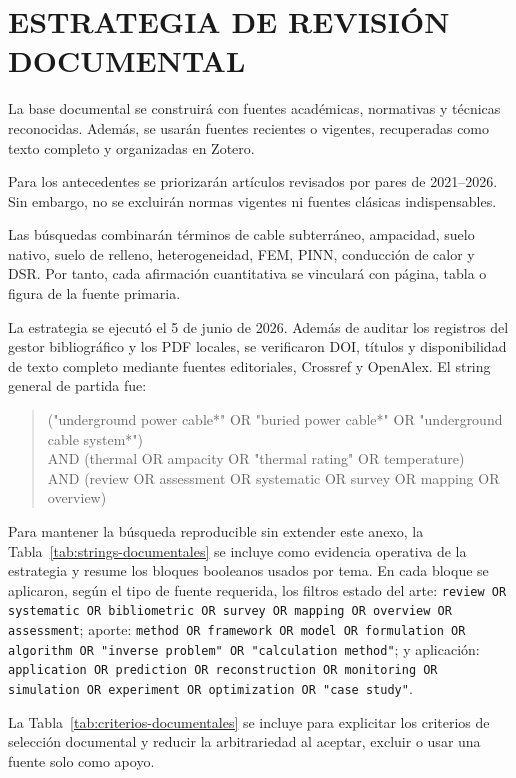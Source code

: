 \section{ESTRATEGIA DE REVISIÓN DOCUMENTAL}
\thispagestyle{empty}

La base documental se construirá con fuentes académicas, normativas y técnicas reconocidas. Además, se usarán fuentes recientes o vigentes, recuperadas como texto completo y organizadas en Zotero.

Para los antecedentes se priorizarán artículos revisados por pares de 2021--2026. Sin embargo, no se excluirán normas vigentes ni fuentes clásicas indispensables.

Las búsquedas combinarán términos de cable subterráneo, ampacidad, suelo nativo, suelo de relleno, heterogeneidad, FEM, PINN, conducción de calor y DSR. Por tanto, cada afirmación cuantitativa se vinculará con página, tabla o figura de la fuente primaria.

La estrategia se ejecutó el 5 de junio de 2026. Además de auditar los registros del gestor bibliográfico y los PDF locales, se verificaron DOI, títulos y disponibilidad de texto completo mediante fuentes editoriales, Crossref y OpenAlex. El string general de partida fue:

\begin{quote}\scriptsize\ttfamily\RaggedRight
("underground power cable*" OR "buried power cable*" OR "underground cable system*")\\
AND (thermal OR ampacity OR "thermal rating" OR temperature)\\
AND (review OR assessment OR systematic OR survey OR mapping OR overview)
\end{quote}

Para mantener la búsqueda reproducible sin extender este anexo, la Tabla~\ref{tab:strings-documentales} se incluye como evidencia operativa de la estrategia y resume los bloques booleanos usados por tema. En cada bloque se aplicaron, según el tipo de fuente requerida, los filtros estado del arte: \texttt{review OR systematic OR bibliometric OR survey OR mapping OR overview OR assessment}; aporte: \texttt{method OR framework OR model OR formulation OR algorithm OR "inverse problem" OR "calculation method"}; y aplicación: \texttt{application OR prediction OR reconstruction OR monitoring OR simulation OR experiment OR optimization OR "case study"}.

La Tabla~\ref{tab:criterios-documentales} se incluye para explicitar los criterios de selección documental y reducir la arbitrariedad al aceptar, excluir o usar una fuente solo como apoyo.

